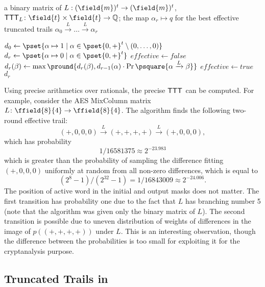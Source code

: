 \begin{algorithm}
    \begin{algorithmic}[1]
    \Require a binary matrix of $L: (\field{m})^t \to (\field{m})^t$, $\TTT{L}\colon \field{t} \times \field{t} \to \mathbb{Q}$;
    \Ensure the map $\alpha_r \mapsto q$ for the best effective truncated trails $\alpha_0 \xrightarrow{L} \ldots \xrightarrow{L} \alpha_r$
    
    \State $d_0 \gets \pset{\alpha \mapsto 1 \mid \alpha \in \pset{0,\exact}^t\setminus(0,\ldots,0)}$
        \State $d_r \gets \pset{\alpha \mapsto 0 \mid \alpha \in \pset{0,\exact}^t}$
        \State $effective \gets false$
            \State $d_r(\beta) \gets \max\pround{ d_r(\beta), d_{r-1}(\alpha) \cdot \Pr\psquare{\alphabeta}}$
             
                \State $effective \gets true$
            \EndIf
        \EndFor
            \State \Return $d_r$ 
        \EndIf
    \EndFor
    \end{algorithmic}
\end{algorithm}

Using precise arithmetics over rationals, the precise $\mathsf{TTT}_{}$ can be computed. For example, consider the AES MixColumn matrix $L\colon \ffield{8}{4} \to \ffield{8}{4}$.
The algorithm finds the following two-round effective trail:
$$
(+, 0, 0, 0) \xrightarrow{L} (+, +, +, +) \xrightarrow{L} (+, 0, 0, 0),
$$
which has probability
$$
1/16581375 \approx 2^{-23.983}
$$
which is greater than the probability of sampling the difference fitting $(+, 0, 0, 0)$ uniformly at random from all non-zero differences, which is equal to $$
(2^8-1)/(2^{32}-1)=1/16843009\approx 2^{-24.006}.
$$
The position of active word in the initial and output masks does not matter. The first transition has probability one due to the fact that $L$ has branching number 5 (note that the algorithm was given only the binary matrix of $L$). The second transition is possible due to uneven distribution of weights of differences in the image of $p((+,+,+,+))$ under $L$. This is an interesting observation, though the difference between the probabilities is too small for exploiting it for the cryptanalysis purpose.


\subsection{Truncated Trails in \aCipher{}}

